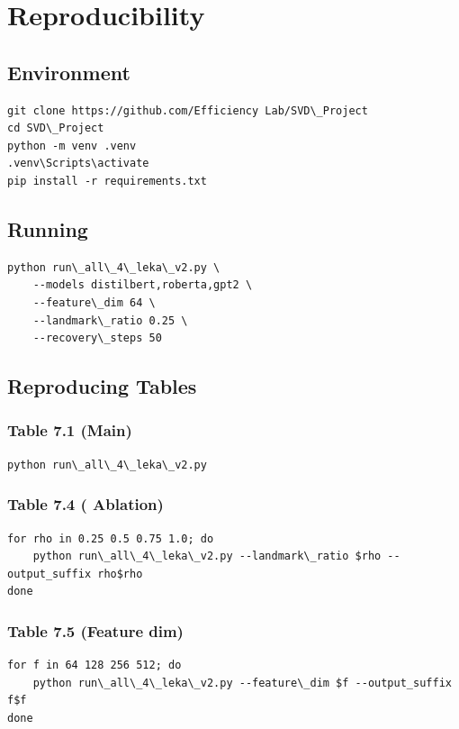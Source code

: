 \section{Reproducibility}

\subsection{Environment}

\begin{lstlisting}
git clone https://github.com/Efficiency Lab/SVD\_Project
cd SVD\_Project
python -m venv .venv
.venv\Scripts\activate
pip install -r requirements.txt
\end{lstlisting}

\subsection{Running}

\begin{lstlisting}
python run\_all\_4\_leka\_v2.py \
    --models distilbert,roberta,gpt2 \
    --feature\_dim 64 \
    --landmark\_ratio 0.25 \
    --recovery\_steps 50
\end{lstlisting}

\subsection{Reproducing Tables}

\subsubsection{Table 7.1 (Main)}
\begin{lstlisting}
python run\_all\_4\_leka\_v2.py
\end{lstlisting}

\subsubsection{Table 7.4 (  Ablation)}
\begin{lstlisting}
for rho in 0.25 0.5 0.75 1.0; do
    python run\_all\_4\_leka\_v2.py --landmark\_ratio $rho --output_suffix rho$rho
done
\end{lstlisting}

\subsubsection{Table 7.5 (Feature dim)}
\begin{lstlisting}
for f in 64 128 256 512; do
    python run\_all\_4\_leka\_v2.py --feature\_dim $f --output_suffix f$f
done
\end{lstlisting}


